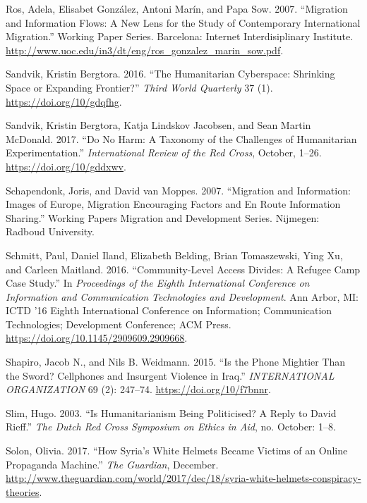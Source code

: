 \begin{cslreferences}
\leavevmode\hypertarget{ref-Ros2007Migration}{}%
Ros, Adela, Elisabet González, Antoni Marín, and Papa Sow. 2007.
``Migration and Information Flows: A New Lens for the Study of
Contemporary International Migration.'' Working Paper Series. Barcelona:
Internet Interdisiplinary Institute.
\url{http://www.uoc.edu/in3/dt/eng/ros_gonzalez_marin_sow.pdf}.

\leavevmode\hypertarget{ref-Sandvik2016Humanitarian}{}%
Sandvik, Kristin Bergtora. 2016. ``The Humanitarian Cyberspace:
Shrinking Space or Expanding Frontier?'' \emph{Third World Quarterly} 37
(1). \url{https://doi.org/10/gdqfhg}.

\leavevmode\hypertarget{ref-Sandvik2017Do}{}%
Sandvik, Kristin Bergtora, Katja Lindskov Jacobsen, and Sean Martin
McDonald. 2017. ``Do No Harm: A Taxonomy of the Challenges of
Humanitarian Experimentation.'' \emph{International Review of the Red
Cross}, October, 1--26. \url{https://doi.org/10/gddxwv}.

\leavevmode\hypertarget{ref-Schapendonk2007Migration}{}%
Schapendonk, Joris, and David van Moppes. 2007. ``Migration and
Information: Images of Europe, Migration Encouraging Factors and En
Route Information Sharing.'' Working Papers Migration and Development
Series. Nijmegen: Radboud University.

\leavevmode\hypertarget{ref-Schmitt2016Community-Level}{}%
Schmitt, Paul, Daniel Iland, Elizabeth Belding, Brian Tomaszewski, Ying
Xu, and Carleen Maitland. 2016. ``Community-Level Access Divides: A
Refugee Camp Case Study.'' In \emph{Proceedings of the Eighth
International Conference on Information and Communication Technologies
and Development}. Ann Arbor, MI: ICTD '16 Eighth International
Conference on Information; Communication Technologies; Development
Conference; ACM Press. \url{https://doi.org/10.1145/2909609.2909668}.

\leavevmode\hypertarget{ref-Shapiro2015Is}{}%
Shapiro, Jacob N., and Nils B. Weidmann. 2015. ``Is the Phone Mightier
Than the Sword? Cellphones and Insurgent Violence in Iraq.''
\emph{INTERNATIONAL ORGANIZATION} 69 (2): 247--74.
\url{https://doi.org/10/f7bnnr}.

\leavevmode\hypertarget{ref-Slim2003Is}{}%
Slim, Hugo. 2003. ``Is Humanitarianism Being Politicised? A Reply to
David Rieff.'' \emph{The Dutch Red Cross Symposium on Ethics in Aid},
no. October: 1--8.

\leavevmode\hypertarget{ref-Solon2017How}{}%
Solon, Olivia. 2017. ``How Syria's White Helmets Became Victims of an
Online Propaganda Machine.'' \emph{The Guardian}, December.
\url{http://www.theguardian.com/world/2017/dec/18/syria-white-helmets-conspiracy-theories}.


\end{cslreferences}
